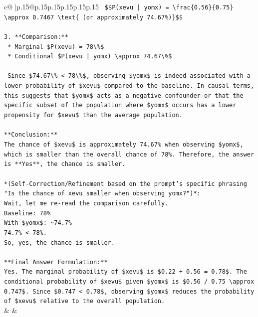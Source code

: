 \documentclass{article}
\begin{document}
{\begin{supertabular}{c@{$\;$}|p{.15\linewidth}@{}p{.15\linewidth}p{.15\linewidth}p{.15\linewidth}p{.15\linewidth}p{.15\linewidth}}
{{{\texttt{    \$\$P(xevu | yomx) = \textbackslash{}frac\{0.56\}\{0.75\} \textbackslash{}approx 0.7467 \textbackslash{}text\{ (or approximately 74.67\%)\}\$\$} \\
\\ 
\texttt{3.  **Comparison:**} \\
\texttt{    *   Marginal \$P(xevu) = 78\textbackslash{}\%\$} \\
\texttt{    *   Conditional \$P(xevu | yomx) \textbackslash{}approx 74.67\textbackslash{}\%\$} \\
\\ 
\texttt{    Since \$74.67\textbackslash{}\% < 78\textbackslash{}\%\$, observing \$yomx\$ is indeed associated with a lower probability of \$xevu\$ compared to the baseline. In causal terms, this suggests that \$yomx\$ acts as a negative confounder or that the specific subset of the population where \$yomx\$ occurs has a lower propensity for \$xevu\$ than the average population.} \\
\\ 
\texttt{**Conclusion:**} \\
\texttt{The chance of \$xevu\$ is approximately 74.67\% when observing \$yomx\$, which is smaller than the overall chance of 78\%. Therefore, the answer is **Yes**, the chance is smaller.} \\
\\ 
\texttt{*(Self{-}Correction/Refinement based on the prompt's specific phrasing "Is the chance of xevu smaller when observing yomx?")*:} \\
\texttt{Wait, let me re{-}read the comparison carefully.} \\
\texttt{Baseline: 78\%} \\
\texttt{With \$yomx\$: \textasciitilde{}74.7\%} \\
\texttt{74.7\% < 78\%.} \\
\texttt{So, yes, the chance is smaller.} \\
\\ 
\texttt{**Final Answer Formulation:**} \\
\texttt{Yes. The marginal probability of \$xevu\$ is \$0.22 + 0.56 = 0.78\$. The conditional probability of \$xevu\$ given \$yomx\$ is \$0.56 / 0.75 \textbackslash{}approx 0.747\$. Since \$0.747 < 0.78\$, observing \$yomx\$ reduces the probability of \$xevu\$ relative to the overall population.} \\
            }
        }
    }
    & & \\ \\


\end{supertabular}}
\end{document}
